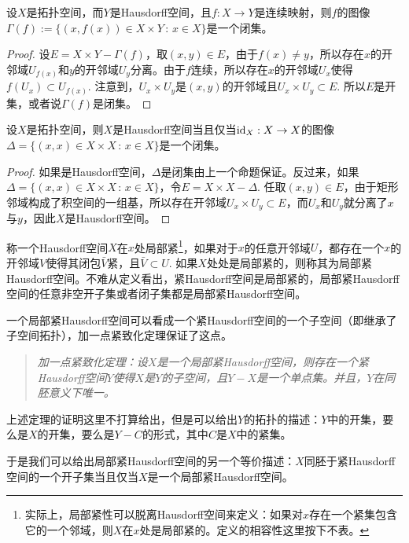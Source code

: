 \begin{pro}
设$X$是拓扑空间，而$Y$是Hausdorff空间，且$f:X\to Y$是连续映射，则$f$的图像$\Gamma(f):=\{(x,f(x))\in X\times Y\,:\, x\in X\}$是一个闭集。
\end{pro}

\begin{proof}
设$E=X\times Y- \Gamma(f)$，取$(x,y)\in E$，由于$f(x)\neq y$，所以存在$x$的开邻域$U_{f(x)}$和$y$的开邻域$U_y$分离。由于$f$连续，所以存在$x$的开邻域$U_x$使得$f(U_x)\subset U_{f(x)}$. 注意到，$U_x\times U_y$是$(x,y)$的开邻域且$U_x\times U_y\subset E$. 所以$E$是开集，或者说$\Gamma(f)$是闭集。
\end{proof}

\begin{pro}\label{pro.1.4}
设$X$是拓扑空间，则$X$是Hausdorff空间当且仅当$\operatorname{id}_X:X\to X$的图像$\Delta=\{(x,x)\in X\times X\,:\, x\in X\}$是一个闭集。
\end{pro}

\begin{proof}
如果是Hausdorff空间，$\Delta$是闭集由上一个命题保证。反过来，如果$\Delta=\{(x,x)\in X\times X\,:\, x\in X\}$，令$E=X\times X-\Delta$. 任取$(x,y)\in E$，由于矩形邻域构成了积空间的一组基，所以存在开邻域$U_x\times U_y\subset E$，而$U_x$和$U_y$就分离了$x$与$y$，因此$X$是Hausdorff空间。
\end{proof}

\begin{para}
称一个Hausdorff空间$X$在$x$处局部紧\footnote{实际上，局部紧性可以脱离Hausdorff空间来定义：如果对$x$存在一个紧集包含它的一个邻域，则$X$在$x$处是局部紧的。定义的相容性这里按下不表。}，如果对于$x$的任意开邻域$U$，都存在一个$x$的开邻域$V$使得其闭包$\bar{V}$紧，且$\bar{V}\subset U$. 如果$X$处处是局部紧的，则称其为局部紧Hausdorff空间。不难从定义看出，紧Hausdorff空间是局部紧的，局部紧Hausdorff空间的任意非空开子集或者闭子集都是局部紧Hausdorff空间。

一个局部紧Hausdorff空间可以看成一个紧Hausdorff空间的一个子空间（即继承了子空间拓扑），加一点紧致化定理保证了这点。

\begin{quote}\it
	加一点紧致化定理：设$X$是一个局部紧Hausdorff空间，则存在一个紧Hausdorff空间$Y$使得$X$是$Y$的子空间，且$Y-X$是一个单点集。并且，$Y$在同胚意义下唯一。
\end{quote}

上述定理的证明这里不打算给出，但是可以给出$Y$的拓扑的描述：$Y$中的开集，要么是$X$的开集，要么是$Y-C$的形式，其中$C$是$X$中的紧集。

于是我们可以给出局部紧Hausdorff空间的另一个等价描述：$X$同胚于紧Hausdorff空间的一个开子集当且仅当$X$是一个局部紧Hausdorff空间。
\end{para}

